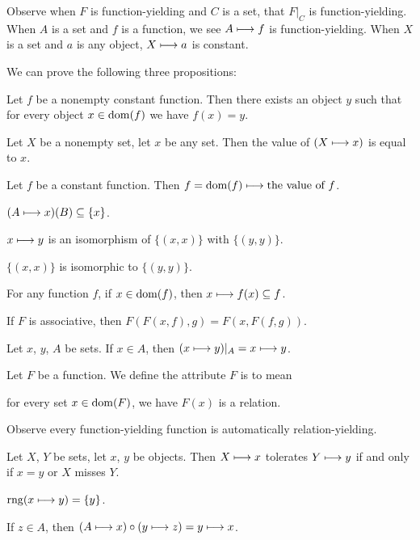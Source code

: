 \documentclass{article}
\begin{document}
Observe when $F$ is function-yielding and $C$ is a set, that $F|_{C}$ is function-yielding.
When $A$ is a set and $f$ is a function, we see $A\longmapsto f$ is
function-yielding.
When $X$ is a set and $a$ is any object, $X\longmapsto a$ is constant.

We can prove the following three propositions:
\begin{thm}
\item\label{funcop1:78} Let $f$ be a nonempty constant function.
  Then there exists an object $y$ such that for every object $x\in\operatorname{dom}(f)$
  we have $f(x)=y$.
\item\label{funcop1:79} Let $X$ be a nonempty set, let $x$ be any set.
  Then the value of $(X\longmapsto x)$ is equal to $x$.
\item\label{funcop1:80} Let $f$ be a constant function.
  Then $f=\operatorname{dom}(f)\longmapsto\mbox{the value of }f$.
\item\label{funcop1:81} $(A\longmapsto x)(B)\subseteq\{x\}$.
\item\label{funcop1:82} $x\longmapsto y$ is an isomorphism of
  $\{(x,x)\}$ with $\{(y,y)\}$.
\item\label{funcop1:83} $\{(x,x)\}$ is isomorphic to $\{(y,y)\}$.
\item\label{funcop1:84} For any function $f$, if $x\in\operatorname{dom}(f)$, then
  $x\longmapsto f(x)\subseteq f$.
\item\label{funcop1:85} If $F$ is associative,
  then $F(F(x,f),g)=F(x,F(f,g))$.
\item\label{funcop1:86} Let $x$, $y$, $A$ be sets. If $x\in A$, then
  $(x\longmapsto y)|_{A}=x\longmapsto y$.
\end{thm}

\begin{definition}
Let $F$ be a function.
We define the attribute $F$ is  to mean
\begin{defn}
\item for every set $x\in\operatorname{dom}(F)$, we have $F(x)$ is a relation.
\end{defn}
\end{definition}

Observe every function-yielding function is automatically relation-yielding.

\begin{thm}
\item\label{funcop1:87} Let $X$, $Y$ be sets, let $x$, $y$ be objects.
  Then $X\longmapsto x$ tolerates $Y\longmapsto y$ if and only if
  $x=y$ or $X$ misses $Y$.
\item\label{funcop1:88} $\operatorname{rng}(x\longmapsto y)=\{y\}$.
\item\label{funcop1:89} If $z\in A$, then $(A\longmapsto x)\circ(y\longmapsto z)=y\longmapsto x$.
\end{thm}
\end{document}

